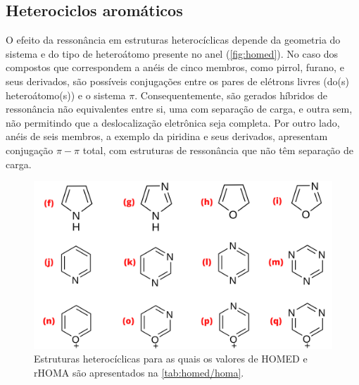 \newpage

\subsection{Heterociclos aromáticos}

O efeito da ressonância em estruturas heterocíclicas depende da geometria do sistema e do tipo de heteroátomo presente no anel (\autoref{fig:homed}). No caso dos compostos que correspondem a anéis de cinco membros, como pirrol, furano, e seus derivados, são possíveis conjugações entre os pares de elétrons livres (do(s) heteroátomo(s)) e o sistema $\pi$. Consequentemente, são gerados híbridos de ressonância não equivalentes entre si, uma com separação de carga, e outra sem, não permitindo que a deslocalização eletrônica seja completa. Por outro lado, anéis de seis membros, a exemplo da piridina e seus derivados, apresentam conjugação $\pi-\pi$ total, com estruturas de ressonância que não têm separação de carga.

\begin{figure}[htb]
\caption{\label{fig:homed} Estruturas heterocíclicas para as quais os valores de \gls{HOMED} e \gls{rHOMA} são apresentados na \autoref{tab:homed/homa}.}
	\begin{center}
		\includegraphics[width=1.0\textwidth]{images/fig2(7).png}
	\end{center}
\end{figure}

